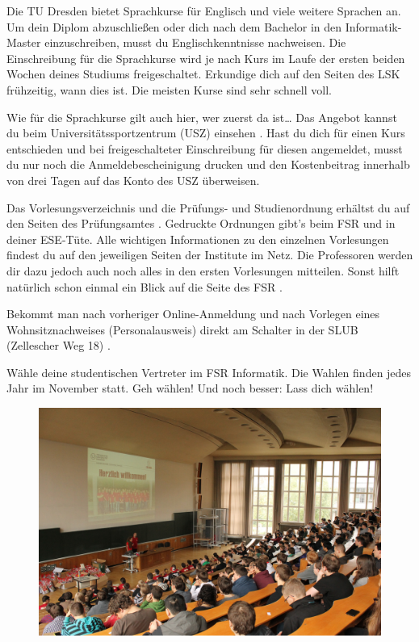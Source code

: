\begin{itemize}[leftmargin=*]
Die TU Dresden bietet Sprachkurse für Englisch und viele weitere Sprachen an. Um dein Diplom abzuschließen oder dich nach dem Bachelor in den Informatik-Master einzuschreiben, musst du Englischkenntnisse nachweisen. Die Einschreibung für die Sprachkurse wird je nach Kurs im Laufe der ersten beiden Wochen deines Studiums freigeschaltet.
Erkundige dich auf den Seiten des LSK  frühzeitig, wann dies ist. Die meisten Kurse sind sehr schnell voll.

Wie für die Sprachkurse gilt auch hier, wer zuerst da ist\ldots{} Das Angebot kannst du beim Universitätssportzentrum (USZ) einsehen .
Hast du dich für einen Kurs entschieden und bei freigeschalteter Einschreibung für diesen angemeldet, musst du nur noch die Anmeldebescheinigung drucken und den Kostenbeitrag innerhalb von drei Tagen auf das Konto des USZ überweisen.

\newpage

Das Vorlesungsverzeichnis und die Prüfungs- und Studienordnung erhältst du auf den Seiten des Prüfungsamtes .
Gedruckte Ordnungen gibt's beim FSR und in deiner ESE-Tüte.
Alle wichtigen Informationen zu den einzelnen Vorlesungen findest du auf den jeweiligen Seiten der Institute im Netz.
Die Professoren werden dir dazu jedoch auch noch alles in den ersten Vorlesungen mitteilen. Sonst hilft natürlich schon einmal ein Blick auf die Seite des FSR .

Bekommt man nach vorheriger Online-Anmeldung und nach Vorlegen eines Wohnsitznachweises (Personalausweis) direkt am Schalter in der SLUB (Zellescher Weg 18) .

Wähle deine studentischen Vertreter im FSR Informatik.
Die Wahlen finden jedes Jahr im November statt.
Geh wählen!
Und noch besser: Lass dich wählen!

\vfill

\begin{figure}[h!]
\centering
\includegraphics[width=0.9\linewidth]{img/ese2013/barschoe.jpg}
\end{figure}


\end{itemize}

